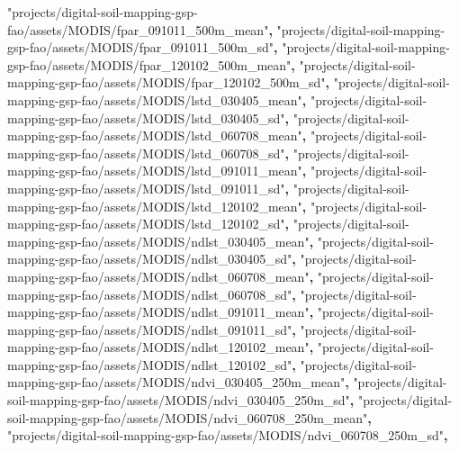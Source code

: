 \documentclass[
  10pt,
  b5paper,
  oneside]{book}
\newenvironment{Shaded}{\begin{snugshade}}{\end{snugshade}}
\newcommand{\OperatorTok}[1]{\textcolor[rgb]{0.81,0.36,0.00}{\textbf{#1}}}
\newcommand{\StringTok}[1]{\textcolor[rgb]{0.31,0.60,0.02}{#1}}
\begin{document}
\begin{Shaded}
\begin{Highlighting}[]
\StringTok{"projects/digital{-}soil{-}mapping{-}gsp{-}fao/assets/MODIS/fpar\_091011\_500m\_mean"}\OperatorTok{,}
\StringTok{"projects/digital{-}soil{-}mapping{-}gsp{-}fao/assets/MODIS/fpar\_091011\_500m\_sd"}\OperatorTok{,}
\StringTok{"projects/digital{-}soil{-}mapping{-}gsp{-}fao/assets/MODIS/fpar\_120102\_500m\_mean"}\OperatorTok{,}
\StringTok{"projects/digital{-}soil{-}mapping{-}gsp{-}fao/assets/MODIS/fpar\_120102\_500m\_sd"}\OperatorTok{,}
\StringTok{"projects/digital{-}soil{-}mapping{-}gsp{-}fao/assets/MODIS/lstd\_030405\_mean"}\OperatorTok{,}
\StringTok{"projects/digital{-}soil{-}mapping{-}gsp{-}fao/assets/MODIS/lstd\_030405\_sd"}\OperatorTok{,}
\StringTok{"projects/digital{-}soil{-}mapping{-}gsp{-}fao/assets/MODIS/lstd\_060708\_mean"}\OperatorTok{,}
\StringTok{"projects/digital{-}soil{-}mapping{-}gsp{-}fao/assets/MODIS/lstd\_060708\_sd"}\OperatorTok{,}
\StringTok{"projects/digital{-}soil{-}mapping{-}gsp{-}fao/assets/MODIS/lstd\_091011\_mean"}\OperatorTok{,}
\StringTok{"projects/digital{-}soil{-}mapping{-}gsp{-}fao/assets/MODIS/lstd\_091011\_sd"}\OperatorTok{,}
\StringTok{"projects/digital{-}soil{-}mapping{-}gsp{-}fao/assets/MODIS/lstd\_120102\_mean"}\OperatorTok{,}
\StringTok{"projects/digital{-}soil{-}mapping{-}gsp{-}fao/assets/MODIS/lstd\_120102\_sd"}\OperatorTok{,}
\StringTok{"projects/digital{-}soil{-}mapping{-}gsp{-}fao/assets/MODIS/ndlst\_030405\_mean"}\OperatorTok{,}
\StringTok{"projects/digital{-}soil{-}mapping{-}gsp{-}fao/assets/MODIS/ndlst\_030405\_sd"}\OperatorTok{,}
\StringTok{"projects/digital{-}soil{-}mapping{-}gsp{-}fao/assets/MODIS/ndlst\_060708\_mean"}\OperatorTok{,}
\StringTok{"projects/digital{-}soil{-}mapping{-}gsp{-}fao/assets/MODIS/ndlst\_060708\_sd"}\OperatorTok{,}
\StringTok{"projects/digital{-}soil{-}mapping{-}gsp{-}fao/assets/MODIS/ndlst\_091011\_mean"}\OperatorTok{,}
\StringTok{"projects/digital{-}soil{-}mapping{-}gsp{-}fao/assets/MODIS/ndlst\_091011\_sd"}\OperatorTok{,}
\StringTok{"projects/digital{-}soil{-}mapping{-}gsp{-}fao/assets/MODIS/ndlst\_120102\_mean"}\OperatorTok{,}
\StringTok{"projects/digital{-}soil{-}mapping{-}gsp{-}fao/assets/MODIS/ndlst\_120102\_sd"}\OperatorTok{,}
\StringTok{"projects/digital{-}soil{-}mapping{-}gsp{-}fao/assets/MODIS/ndvi\_030405\_250m\_mean"}\OperatorTok{,}
\StringTok{"projects/digital{-}soil{-}mapping{-}gsp{-}fao/assets/MODIS/ndvi\_030405\_250m\_sd"}\OperatorTok{,}
\StringTok{"projects/digital{-}soil{-}mapping{-}gsp{-}fao/assets/MODIS/ndvi\_060708\_250m\_mean"}\OperatorTok{,}
\StringTok{"projects/digital{-}soil{-}mapping{-}gsp{-}fao/assets/MODIS/ndvi\_060708\_250m\_sd"}\OperatorTok{,}

\end{Highlighting}
\end{Shaded}
\end{document}
